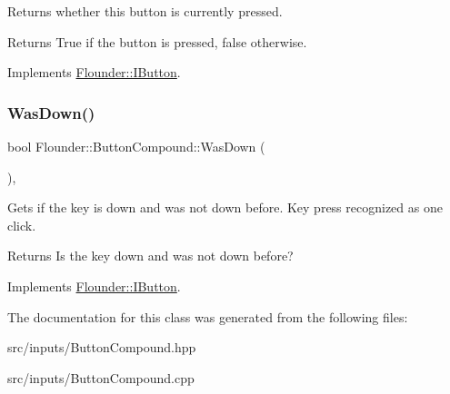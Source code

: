 Returns whether this button is currently pressed. 

\begin{DoxyReturn}{Returns}
True if the button is pressed, false otherwise. 
\end{DoxyReturn}


Implements \hyperlink{class_flounder_1_1_i_button_a264519250d835422748bcc1af9be38e3}{Flounder\+::\+I\+Button}.

\mbox{\label{class_flounder_1_1_button_compound_a89f7e5a22a14d10a02974955f3fac8d1}} 
\subsubsection{\texorpdfstring{Was\+Down()}{WasDown()}}
{\footnotesize\ttfamily bool Flounder\+::\+Button\+Compound\+::\+Was\+Down (\begin{DoxyParamCaption}{ }\end{DoxyParamCaption})\hspace{0.3cm}{\ttfamily [override]}, {\ttfamily [virtual]}}



Gets if the key is down and was not down before. Key press recognized as one click. 

\begin{DoxyReturn}{Returns}
Is the key down and was not down before? 
\end{DoxyReturn}


Implements \hyperlink{class_flounder_1_1_i_button_af31c7669349991fe6a57beb8bd42c5b2}{Flounder\+::\+I\+Button}.



The documentation for this class was generated from the following files\+:\begin{DoxyCompactItemize}
\item 
src/inputs/Button\+Compound.\+hpp\item 
src/inputs/Button\+Compound.\+cpp\end{DoxyCompactItemize}
